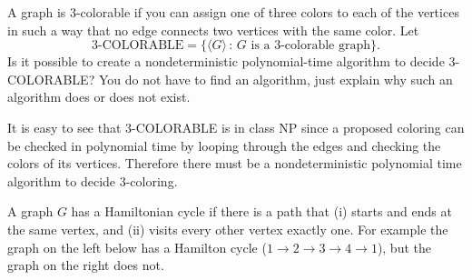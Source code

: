 \documentclass[12pt]{exam}
\begin{document}
\begin{questions}
%
%


\question[8] A graph is 3-colorable if you can assign one of three colors to each of the vertices in such a way that no edge connects two vertices with the same color.  Let 
$$\text{3-COLORABLE} = \{ \langle G \rangle \, : \, G \text{ is a 3-colorable graph}\}.$$ 
Is it possible to create a nondeterministic polynomial-time algorithm to decide 3-COLORABLE? You do not have to find an algorithm, just explain why such an algorithm does or does not exist.
\begin{solution}
It is easy to see that 3-COLORABLE is in class NP since a proposed coloring can be checked in polynomial time by looping through the edges and checking the colors of its vertices.  Therefore there must be a nondeterministic polynomial time algorithm to decide 3-coloring. 
\end{solution}
\vfill
\vfill
\vfill

\newpage
\question[20] A graph $G$ has a Hamiltonian cycle if there is a path that (i) starts and ends at the same vertex, and (ii) visits every other vertex exactly one. For example the graph on the left below has a Hamilton cycle ($1 \rightarrow 2 \rightarrow 3 \rightarrow 4 \rightarrow 1$), but the graph on the right does not. 
\begin{center}
\end{center}
\end{questions}
\end{document}

